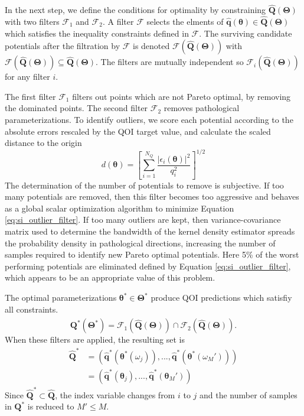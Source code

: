 In the next step, we define the conditions for optimality by constraining $\hat{\bm{Q}}(\bm{\Theta})$ with two filters $\mathcal{F}_1$ and $\mathcal{F}_2$. A filter $\mathcal{F}$ selects the elments of
$\hat{ \bm{q} }(\bm{\theta}) \in \hat{\bm{Q}}(\bm{\Theta})$
which satisfies the inequality constraints defined in $\mathcal{F}$.  The surviving candidate potentials after the filtration by $\mathcal{F}$ is denoted
$\mathcal{F}(\hat{\bm{Q}}(\bm{\Theta}))$ with
$\mathcal{F}(\hat{\bm{Q}}(\bm{\Theta})) \subseteq \hat{\bm{Q}}(\bm{\Theta})$.  The filters are mutually independent so $\mathcal{F}_i(\hat{\bm{Q}}(\bm{\Theta}))$ for any filter $i$.

The first filter $\mathcal{F}_1$ filters out points which are not Pareto optimal, by removing the dominated points.  The second filter $\mathcal{F}_2$ removes pathological parameterizations.  To identify outliers, we score each potential according to the absolute errors rescaled by the QOI target value, and calculate the scaled distance to the origin
\begin{equation}
  \label{eq:si_outlier_filter}
	d(\bm{\theta})
  =
  \left[
    \sum_{i=1}^{N_Q} \frac{|\epsilon_{i}(\bm{\theta})|^2}
                          {q_i^2}
  \right]^{1/2}
\end{equation}
The determination of the number of potentials to remove is subjective.  If too many potentials are removed, then this filter becomes too aggressive and behaves as a global scalar optimization algorithm to minimize Equation \ref{eq:si_outlier_filter}.  If too many outliers are kept, then variance-covariance matrix used to determine the bandwidth of the kernel density estimator spreads the probability density in pathological directions, increasing the number of samples required to identify new Pareto optimal potentials.  Here 5\% of the worst performing potentials are eliminated defined by Equation \ref{eq:si_outlier_filter}, which appears to be an appropriate value of this problem.

The optimal parameterizations $\bm{\theta}^* \in \bm{\Theta}^*$ produce QOI predictions which satisfiy all constraints.
\begin{equation}
  \hat{\bm{Q}^*(\bm{\Theta}^*)}
  =
  \mathcal{F}_1(\hat{\bm{Q}}(\bm{\Theta}))
  \cap
  \mathcal{F}_2(\hat{\bm{Q}}(\bm{\Theta})).
\end{equation}
When these filters are applied, the resulting set is
\begin{subequations}
  \begin{align}
     \hat{\bm{Q}}^*
       &= (\hat{\bm{q}}^*(\bm{\theta}^*(\omega_j)),
           ...,
           \hat{\bm{q}}^*(\bm{\theta}^*(\omega_M'))
          )
      \label{eq:si_qoistar_seq_1} \\
       &= (\hat{\bm{q}}^*(\bm{\theta}_j),
           ...,
           \hat{\bm{q}}^*(\bm{\theta}_M')
          )
      \label{eq:si_qoistar_seq_2}
  \end{align}
\end{subequations}
Since $\hat{\bm{Q}}^* \subset \hat{\bm{Q}}$, the index variable changes from $i$ to $j$ and the number of samples in $\bm{Q}^*$ is reduced to $M' \leq M$.

